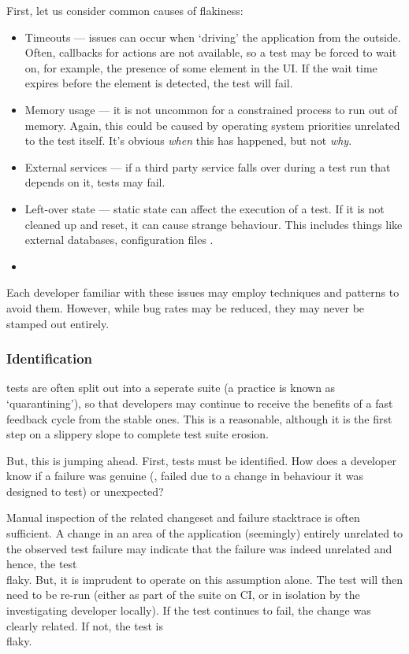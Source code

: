 First, let us consider common causes of flakiness:
\begin{itemize}
	\item Timeouts --- issues can occur when {\lq}driving{\rq} the application from the outside. Often, callbacks for actions are not available, so a test may be forced to wait on, for example, the presence of some element in the UI. If the wait time expires before the element is detected, the test will fail.
	\item Memory usage --- it is not uncommon for a constrained process to run out of memory. Again, this could be caused by operating system priorities unrelated to the test itself. It's obvious \textit{when} this has happened, but not \textit{why}.
	\item External services --- if a third party service falls over during a test run that depends on it, tests may fail.
	\item Left-over state --- static state can affect the execution of a test. If it is not cleaned up and reset, it can cause strange behaviour. This includes things like external databases, configuration files \etc.
	\item {}
\end{itemize}

Each developer familiar with these issues may employ techniques and patterns to avoid them. However, while bug rates may be reduced, they may never be stamped out entirely.

\subsubsection{Identification}

\flaky{} tests are often split out into a seperate suite (a practice is known as {\lq}quarantining{\rq}), so that developers may continue to receive the benefits of a fast feedback cycle from the stable ones. This is a reasonable, although it is the first step on a slippery slope to complete test suite erosion.

But, this is jumping ahead. First, \flaky{} tests must be identified. How does a developer know if a failure was genuine (\ie, failed due to a change in behaviour it was designed to test) or unexpected?

Manual inspection of the related changeset and failure stacktrace is often sufficient. A change in an area of the application (seemingly) entirely unrelated to the observed test failure may indicate that the failure was indeed unrelated and hence, the test \\flaky{}. But, it is imprudent to operate on this assumption alone. The test will then need to be re-run (either as part of the suite on CI, or in isolation by the investigating developer locally). If the test continues to fail, the change was clearly related. If not, the test is \\flaky{}.

